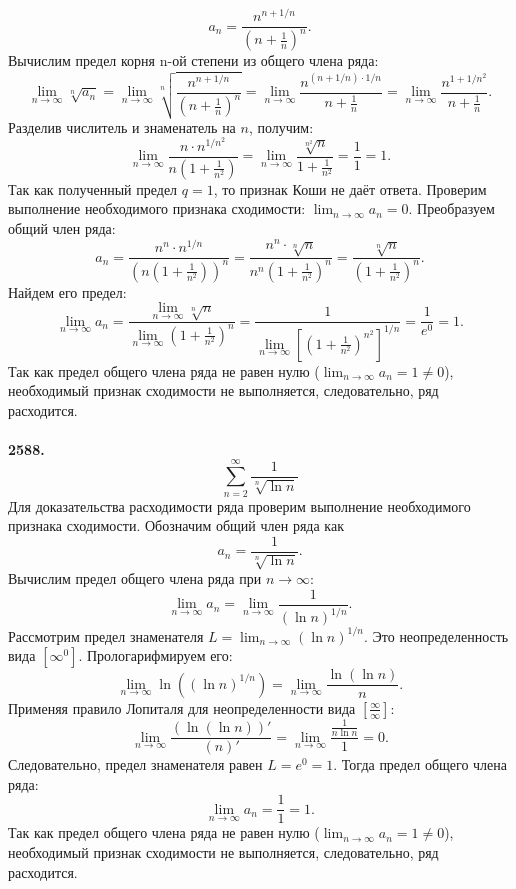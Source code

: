 \documentclass[a4paper, 12pt]{report}
\numberwithin{equation}{section}
\begin{document}
	$$a_n = \frac{n^{n+1/n}}{\left(n+\frac{1}{n}\right)^n}.$$
	Вычислим предел корня n-ой степени из общего члена ряда:
	$$ \lim_{n \to \infty} \sqrt[n]{a_n} = \lim_{n \to \infty} \sqrt[n]{\frac{n^{n+1/n}}{\left(n+\frac{1}{n}\right)^n}} = \lim_{n \to \infty} \frac{n^{(n+1/n) \cdot 1/n}}{n+\frac{1}{n}} = \lim_{n \to \infty} \frac{n^{1+1/n^2}}{n+\frac{1}{n}}. $$
	Разделив числитель и знаменатель на $n$, получим:
	$$ \lim_{n \to \infty} \frac{n \cdot n^{1/n^2}}{n(1+\frac{1}{n^2})} = \lim_{n \to \infty} \frac{\sqrt[n^2]{n}}{1+\frac{1}{n^2}} = \frac{1}{1} = 1. $$
	Так как полученный предел $q = 1$, то признак Коши не даёт ответа.
	Проверим выполнение необходимого признака сходимости: $\lim_{n \to \infty} a_n = 0$. Преобразуем общий член ряда:
	$$ a_n = \frac{n^n \cdot n^{1/n}}{\left(n\left(1+\frac{1}{n^2}\right)\right)^n} = \frac{n^n \cdot \sqrt[n]{n}}{n^n \left(1+\frac{1}{n^2}\right)^n} = \frac{\sqrt[n]{n}}{\left(1+\frac{1}{n^2}\right)^n}. $$
	Найдем его предел:
	$$ \lim_{n \to \infty} a_n = \frac{\lim_{n \to \infty} \sqrt[n]{n}}{\lim_{n \to \infty} \left(1+\frac{1}{n^2}\right)^n} = \frac{1}{\lim_{n \to \infty} \left[\left(1+\frac{1}{n^2}\right)^{n^2}\right]^{1/n}} = \frac{1}{e^0} = 1. $$
	Так как предел общего члена ряда не равен нулю ($\lim_{n \to \infty} a_n = 1 \neq 0$), необходимый признак сходимости не выполняется, следовательно, ряд расходится.
	\\\\
	\textbf{2588.}
	$$\sum_{n=2}^{\infty} \frac{1}{\sqrt[n]{\ln n}}$$
	Для доказательства расходимости ряда проверим выполнение необходимого признака сходимости. Обозначим общий член ряда как
	$$a_n = \frac{1}{\sqrt[n]{\ln n}}.$$
	Вычислим предел общего члена ряда при $n \to \infty$:
	$$ \lim_{n \to \infty} a_n = \lim_{n \to \infty} \frac{1}{(\ln n)^{1/n}}. $$
	Рассмотрим предел знаменателя $L = \lim_{n \to \infty} (\ln n)^{1/n}$. Это неопределенность вида $\left[\infty^0\right]$. Прологарифмируем его:
	$$ \lim_{n \to \infty} \ln\left((\ln n)^{1/n}\right) = \lim_{n \to \infty} \frac{\ln(\ln n)}{n}. $$
	Применяя правило Лопиталя для неопределенности вида $\left[\frac{\infty}{\infty}\right]$:
	$$ \lim_{n \to \infty} \frac{(\ln(\ln n))'}{(n)'} = \lim_{n \to \infty} \frac{\frac{1}{n \ln n}}{1} = 0. $$
	Следовательно, предел знаменателя равен $L = e^0 = 1$. Тогда предел общего члена ряда:
	$$ \lim_{n \to \infty} a_n = \frac{1}{1} = 1. $$
	Так как предел общего члена ряда не равен нулю ($\lim_{n \to \infty} a_n = 1 \neq 0$), необходимый признак сходимости не выполняется, следовательно, ряд расходится.
	\\\\
\end{document}
